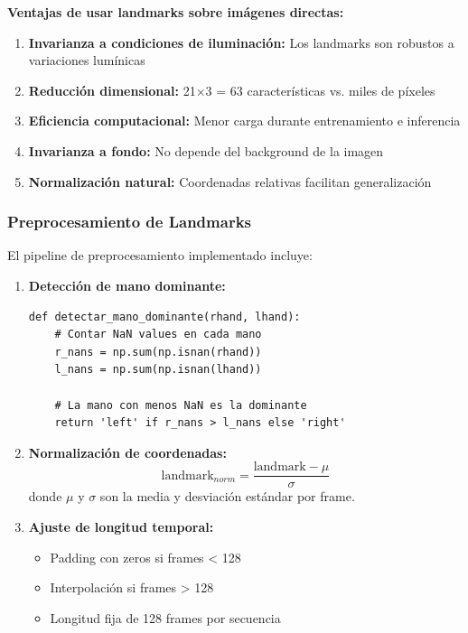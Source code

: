 \documentclass[12pt,a4paper]{article}
\begin{document}
\textbf{Ventajas de usar landmarks sobre imágenes directas:}
\begin{enumerate}
    \item \textbf{Invarianza a condiciones de iluminación:} Los landmarks son robustos a variaciones lumínicas
    \item \textbf{Reducción dimensional:} 21×3 = 63 características vs. miles de píxeles
    \item \textbf{Eficiencia computacional:} Menor carga durante entrenamiento e inferencia
    \item \textbf{Invarianza a fondo:} No depende del background de la imagen
    \item \textbf{Normalización natural:} Coordenadas relativas facilitan generalización
\end{enumerate}

\subsubsection{Preprocesamiento de Landmarks}

El pipeline de preprocesamiento implementado incluye:

\begin{enumerate}
    \item \textbf{Detección de mano dominante:}
    \begin{lstlisting}[style=python, caption=Algoritmo de detección de mano dominante]
def detectar_mano_dominante(rhand, lhand):
    # Contar NaN values en cada mano
    r_nans = np.sum(np.isnan(rhand))
    l_nans = np.sum(np.isnan(lhand))
    
    # La mano con menos NaN es la dominante
    return 'left' if r_nans > l_nans else 'right'
    \end{lstlisting}
    
    \item \textbf{Normalización de coordenadas:}
    \begin{equation}
    \text{landmark}_{norm} = \frac{\text{landmark} - \mu}{\sigma}
    \end{equation}
    donde $\mu$ y $\sigma$ son la media y desviación estándar por frame.
    
    \item \textbf{Ajuste de longitud temporal:}
    \begin{itemize}
        \item Padding con zeros si frames < 128
        \item Interpolación si frames > 128
        \item Longitud fija de 128 frames por secuencia
    \end{itemize}
\end{enumerate}
\end{document}
